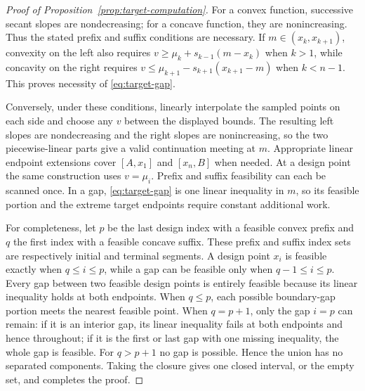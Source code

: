\documentclass{interact}
\theoremstyle{definition}
\theoremstyle{remark}
\begin{document}
\begin{proof}[Proof of Proposition~\ref{prop:target-computation}]
For a convex function, successive secant slopes are nondecreasing; for a
concave function, they are nonincreasing.  Thus the stated prefix and suffix
conditions are necessary.  If $m\in(x_k,x_{k+1})$, convexity on the left also
requires
$v\geq\mu_k+s_{k-1}(m-x_k)$ when $k>1$, while concavity on the right requires
$v\leq\mu_{k+1}-s_{k+1}(x_{k+1}-m)$ when $k<n-1$.  This proves necessity of
\eqref{eq:target-gap}.

Conversely, under these conditions, linearly interpolate the sampled points
on each side and choose any $v$ between the displayed bounds.  The resulting
left slopes are nondecreasing and the right slopes are nonincreasing, so the
two piecewise-linear parts give a valid continuation meeting at $m$.
Appropriate linear endpoint extensions cover $[A,x_1]$ and $[x_n,B]$ when
needed.  At a design point the same construction uses $v=\mu_i$.  Prefix and
suffix feasibility can each be scanned once.  In a gap,
\eqref{eq:target-gap} is one linear inequality in $m$, so its feasible portion
and the extreme target endpoints require constant additional work.

For completeness, let $p$ be the last design index with a feasible convex
prefix and $q$ the first index with a feasible concave suffix.  These prefix
and suffix index sets are respectively initial and terminal segments.  A
design point $x_i$ is feasible exactly when $q\leq i\leq p$, while a gap can
be feasible only when $q-1\leq i\leq p$.  Every gap between two feasible
design points is entirely feasible because its linear inequality holds at
both endpoints.  When $q\leq p$, each possible boundary-gap portion meets the
nearest feasible point.  When $q=p+1$, only the gap $i=p$ can remain: if it is
an interior gap, its linear inequality fails at both endpoints and hence
throughout; if it is the first or last gap with one missing inequality, the
whole gap is feasible.  For $q>p+1$ no gap is possible.  Hence the union has
no separated components.  Taking the closure gives one closed interval, or
the empty set, and completes the proof.
\end{proof}
\end{document}
